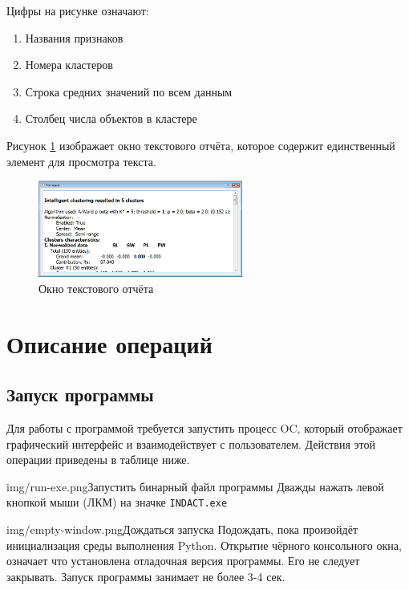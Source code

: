 \documentclass[12pt,tikz]{instruction}
\begin{document}
Цифры на рисунке означают:
\begin{enumerate}
	\item Названия признаков
	\item Номера кластеров
	\item Строка средних значений по всем данным
	\item Столбец числа объектов в кластере
\end{enumerate}
Рисунок \ref{fig:text-report} изображает окно текстового отчёта, которое содержит единственный элемент для просмотра текста.
\begin{figure}[H]
	\centering
	\includegraphics[width=0.6\textwidth]{img/text-report.png}
	\caption{Окно текстового отчёта}
	\label{fig:text-report}
\end{figure}

\newpage
\section{Описание операций}

\subsection{Запуск программы}
Для работы с программой требуется запустить процесс OC, который отображает графический интерфейс и взаимодействует с пользователем. Действия этой операции приведены в таблице ниже.

\begin{steps}
	\begin{ist}{img/run-exe.png}{Запустить бинарный файл программы}
		Дважды нажать левой кнопкой мыши (ЛКМ) на значке \texttt{INDACT.exe}
	\end{ist}
	\begin{ist}{img/empty-window.png}{Дождаться запуска}
		Подождать, пока произойдёт инициализация среды выполнения Python. Открытие чёрного консольного окна, означает что установлена отладочная версия программы. Его не следует закрывать. Запуск программы занимает не более 3-4 сек.   
	\end{ist}
\end{steps}
	
\end{document}

